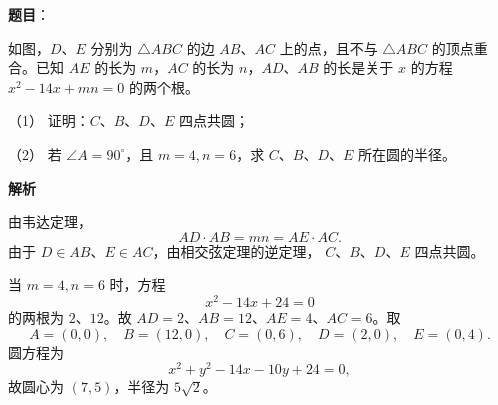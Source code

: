 \begin{answer}

\textbf{题目}：

如图，$D\text{、}E$ 分别为 $\triangle ABC$ 的边 $AB\text{、}AC$ 上的点，且不与 $\triangle ABC$ 的顶点重合。已知 $AE$ 的长为 $m$，$AC$ 的长为 $n$，$AD\text{、}AB$ 的长是关于 $x$ 的方程 $x^2-14x+mn=0$ 的两个根。
\nopagebreak[4]
\begin{center}\end{center}
\nopagebreak[4]
（1） 证明：$C\text{、}B\text{、}D\text{、}E$ 四点共圆；

（2） 若 $\angle A=90^\circ$，且 $m=4,n=6$，求 $C\text{、}B\text{、}D\text{、}E$ 所在圆的半径。

\textbf{解析}


由韦达定理，
\nopagebreak[4]
\[
AD\cdot AB=mn=AE\cdot AC.
\]
由于 $D\in AB$、$E\in AC$，由相交弦定理的逆定理，
$C\text{、}B\text{、}D\text{、}E$ 四点共圆。


当 $m=4,n=6$ 时，方程
\nopagebreak[4]
\[
x^2-14x+24=0
\]
的两根为 $2$、$12$。故
$AD=2$、$AB=12$、$AE=4$、$AC=6$。取
\nopagebreak[4]
\[
A=(0,0),\quad B=(12,0),\quad C=(0,6),\quad
D=(2,0),\quad E=(0,4).
\]
圆方程为
\nopagebreak[4]
\[
x^2+y^2-14x-10y+24=0,
\]
故圆心为 $(7,5)$，半径为 $5\sqrt2$。



\end{answer}
